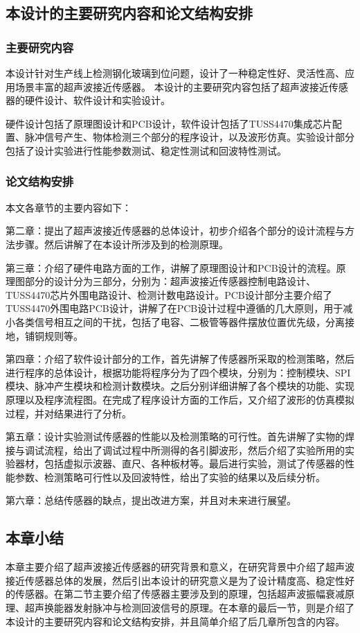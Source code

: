 \subsection{本设计的主要研究内容和论文结构安排}
\subsubsection{主要研究内容}
本设计针对生产线上检测钢化玻璃到位问题，设计了一种稳定性好、灵活性高、应用场景丰富的超声波接近传感器。
本设计的主要研究内容包括了超声波接近传感器的硬件设计、软件设计和实验设计。\par
硬件设计包括了原理图设计和PCB设计，软件设计包括了TUSS4470集成芯片配置、脉冲信号产生、物体检测三个部分的程序设计，以及波形仿真。实验设计部分包括了设计实验进行性能参数测试、稳定性测试和回波特性测试。

\subsubsection{论文结构安排}
本文各章节的主要内容如下：

第二章：提出了超声波接近传感器的总体设计，初步介绍各个部分的设计流程与方法步骤。然后讲解了在本设计所涉及到的检测原理。

第三章：介绍了硬件电路方面的工作，讲解了原理图设计和PCB设计的流程。原理图部分的设计分为三部分，分别为：超声波接近传感器控制电路设计、TUSS4470芯片外围电路设计、检测计数电路设计。PCB设计部分主要介绍了TUSS4470外围电路PCB设计，讲解了在PCB设计过程中遵循的几大原则，用于减小各类信号相互之间的干扰，包括了电容、二极管等器件摆放位置优先级，分离接地，铺铜规则等。

第四章：介绍了软件设计部分的工作，首先讲解了传感器所采取的检测策略，然后进行程序的总体设计，根据功能将程序分为了四个模块，分别为：控制模块、SPI模块、脉冲产生模块和检测计数模块。之后分别详细讲解了各个模块的功能、实现原理以及程序流程图。在完成了程序设计方面的工作后，又介绍了波形的仿真模拟过程，并对结果进行了分析。

第五章：设计实验测试传感器的性能以及检测策略的可行性。首先讲解了实物的焊接与调试流程，给出了调试过程中所测得的各引脚波形，然后介绍了实验所用的实验器材，包括虚拟示波器、直尺、各种板材等。最后进行实验，测试了传感器的性能参数、检测策略可行性以及回波特性，给出了实验的结果以及后续分析。

第六章：总结传感器的缺点，提出改进方案，并且对未来进行展望。

    \subsection{本章小结}
    本章主要介绍了超声波接近传感器的研究背景和意义，在研究背景中介绍了超声波接近传感器总体的发展，然后引出本设计的研究意义是为了设计精度高、稳定性好的传感器。在第二节主要介绍了传感器主要涉及到的原理，包括超声波振幅衰减原理、超声换能器发射脉冲与检测回波信号的原理。在本章的最后一节，则是介绍了本设计的主要研究内容和论文结构安排，并且简单介绍了后几章所包含的内容。